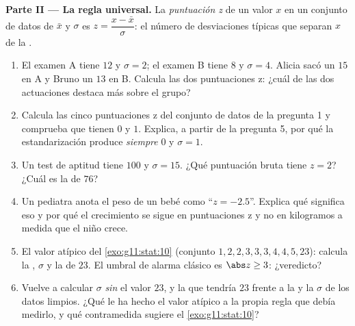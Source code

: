 \begin{problem}
\medskip
\noindent\textbf{Parte II --- La regla universal.}
La \emph{puntuación z} de un valor $x$ en un conjunto
de datos de  $\bar x$ y  $\sigma$ es
$z = \dfrac{x - \bar x}{\sigma}$: el número de desviaciones típicas que
separan $x$ de la .
\begin{enumerate}[resume]
  \item El examen A tiene  $12$ y $\sigma = 2$; el examen B tiene
         $8$ y $\sigma = 4$. Alicia sacó un $15$ en A y Bruno un $13$
        en B. Calcula las dos puntuaciones z: ¿cuál de las dos actuaciones
        destaca más sobre el grupo?
  \item Calcula las cinco puntuaciones z del conjunto de datos de la
        pregunta 1 y comprueba que tienen  $0$ y 
        $1$. Explica, a partir de la pregunta 5, por qué la
        estandarización produce \emph{siempre}  $0$ y $\sigma = 1$.
  \item Un test de aptitud tiene  $100$ y $\sigma = 15$. ¿Qué
        puntuación bruta tiene $z = 2$? ¿Cuál es la  de $76$?
  \item Un pediatra anota el peso de un bebé como ``$z = -2.5$''. Explica
        qué significa eso y por qué el crecimiento se sigue en
        puntuaciones z y no en kilogramos a medida que el niño crece.
  \item El valor atípico del \cref{exo:g11:stat:10} (conjunto
        $1, 2, 2, 3, 3, 3, 4, 4, 5, 23$): calcula la , $\sigma$ y la
         de $23$. El umbral de alarma clásico es
        $\abs z \geq 3$: ¿veredicto?
  \item Vuelve a calcular $\sigma$ \emph{sin} el valor $23$, y la
         que tendría $23$ frente a la  y la $\sigma$ de
        los datos limpios. ¿Qué le ha hecho el valor atípico a la propia
        regla que debía medirlo, y qué contramedida sugiere el
        \cref{exo:g11:stat:10}?
\end{enumerate}


\end{problem}
